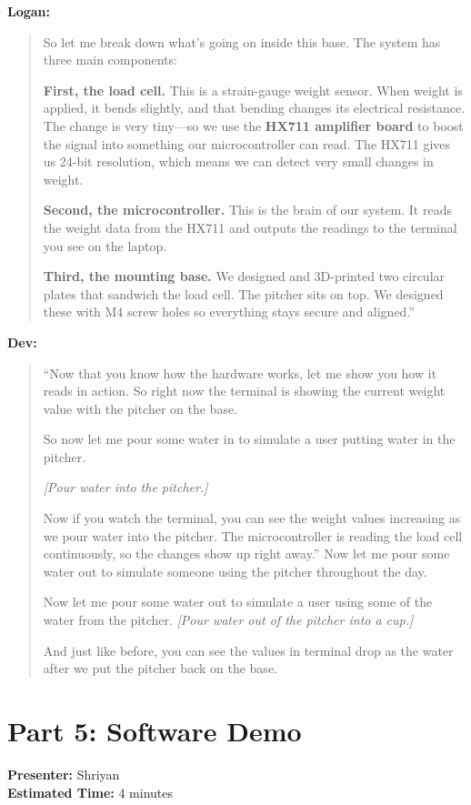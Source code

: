 \documentclass[12pt]{article}
\begin{document}
\medskip
\noindent\textbf{Logan:}
\begin{quote}
So let me break down what's going on inside this base. The system has three main components:

\textbf{First, the load cell.} This is a strain-gauge weight sensor. When weight is applied, it bends slightly, and that bending changes its electrical resistance. The change is very tiny---so we use the \textbf{HX711 amplifier board} to boost the signal into something our microcontroller can read. The HX711 gives us 24-bit resolution, which means we can detect very small changes in weight.

\textbf{Second, the microcontroller.} This is the brain of our system. It reads the weight data from the HX711 and outputs the readings to the terminal you see on the laptop.

\textbf{Third, the mounting base.} We designed and 3D-printed two circular plates that sandwich the load cell. The pitcher sits on top. We designed these with M4 screw holes so everything stays secure and aligned.''
\end{quote}

\medskip
\noindent\textbf{Dev:}
\begin{quote}
``Now that you know how the hardware works, let me show you how it reads in action. So right now the terminal is showing the current weight value with the pitcher on the base.

So now let me pour some water in to simulate a user putting water in the pitcher.

\textit{[Pour water into the pitcher.]}

Now if you watch the terminal, you can see the weight values increasing as we pour water into the pitcher. The microcontroller is reading the load cell continuously, so the changes show up right away.''
Now let me pour some water out to simulate someone using the pitcher throughout the day.


Now let me pour some water out to simulate a user using some of the water from the pitcher.
\textit{[Pour water out of the pitcher into a cup.]}
 
And just like before, you can see the values in terminal drop as the water after we put the pitcher back on the base.

\end{quote}



\section*{Part 5: Software Demo}
\noindent\textbf{Presenter:} Shriyan\\  
\noindent\textbf{Estimated Time:} 4 minutes
\end{document}
